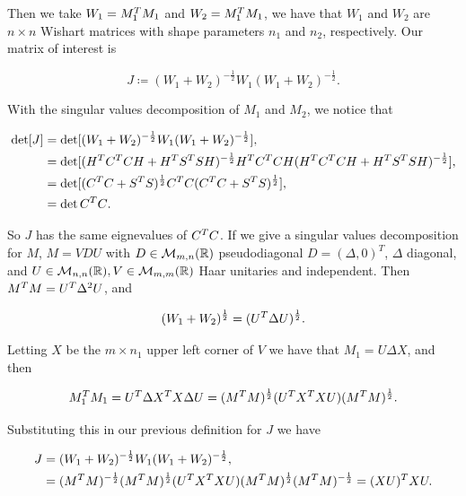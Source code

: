 Then we take $W_1 = M_1^TM_1$ and $W_2 = M_1^TM_1$, we have that $W_1$ and $W_2$ are $n\times n$ Wishart matrices with shape parameters $n_1$ and $n_2$, respectively. Our matrix of interest is

\begin{equation*}
    J \coloneqq (W_1 + W_2)^{-\frac12} W_1 (W_1 + W_2)^{-\frac12}.
\end{equation*}

    With the singular values decomposition of $M_1$ and $M_2$, we notice that 

\begin{align*}
    \det[J] &= \det[(W_1 + W_2)^{-\frac12} W_1 (W_1 + W_2)^{-\frac12}],\\ 
    &= \det[(H^T C^T C H + H^T S^TS H)^{-\frac12}H^T C^T C H(H^T C^T C H + H^T S^TS H)^{-\frac12}],\\
    &= \det[(C^T C + S^T S)^{\frac12}C^TC (C^T C + S^T S)^{\frac12}],\\
    &= \det{C^TC}.
\end{align*}

So $J$ has the same eignevalues of $C^TC$. If we give a singular values decomposition for $M$, $M = VDU$ with $D \in \mathcal M_{m,n}(\mathbb R)$ pseudodiagonal $D = (\Delta, 0)^T$, $\Delta$ diagonal, and $U \in \mathcal M_{n,n}(\mathbb R),V \in \mathcal M_{m,m}(\mathbb R)$ Haar unitaries and independent. Then $M^T M = U^T \Delta^2 U$, and

\begin{equation*}
    (W_1 + W_2)^{\frac12} = (U^T \Delta U)^{\frac12}.
\end{equation*}

Letting $X$ be the $m\times n_1$ upper left corner of $V$ we have that $M_1 = U\Delta X$, and then

\begin{equation*}
    M_1^TM_1 = U^T \Delta X^T X \Delta U = (M^T M)^{\frac12} (U^T X^T X U)  (M^T M)^{\frac12}.
\end{equation*}

Substituting this in our previous definition for $J$ we have

\begin{align*}
    J &= (W_1 + W_2)^{-\frac12} W_1 (W_1 + W_2)^{-\frac12},\\ &= (M^T M)^{-\frac12} (M^T M)^{\frac12} (U^T X^T X U)  (M^T M)^{\frac12} (M^T M)^{-\frac12} = (XU)^TXU.
\end{align*}


